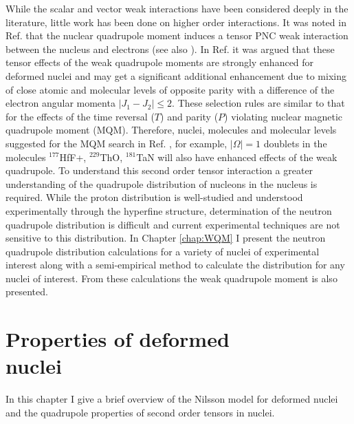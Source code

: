 \documentclass[10pt,a4paper, twoside, openright]{report}
\begin{document}
\linebreak
While the scalar and vector weak interactions have been considered deeply in the literature, little work has been done on higher order interactions. It was noted in Ref.  \cite{FS78} that the nuclear quadrupole moment induces a tensor PNC weak interaction between the nucleus and electrons (see also  \cite{KhriplovichPNC,KP91}). In Ref. \cite{Flambaum2016} it was argued that these tensor  effects of the weak quadrupole moments are strongly enhanced for deformed nuclei and may get a significant additional enhancement due to mixing of  close atomic and molecular levels of opposite parity with a  difference of the electron angular momenta $|J_1-J_2| \le 2$. These selection rules are similar to that for the effects of the time reversal ($T$) and parity ($P$) violating nuclear magnetic quadrupole moment (MQM). Therefore, nuclei, molecules and molecular levels  suggested for the MQM search in Ref. \cite{Flambaum2014},  for example,  $|\Omega |=1$ doublets in the molecules $^{177}$HfF+, $^{229}$ThO, $^{181}$TaN will also have enhanced effects of the weak quadrupole. To understand this second order tensor interaction a greater understanding of the quadrupole distribution of nucleons in the nucleus is required. While the proton distribution is well-studied and understood experimentally through the hyperfine structure, determination of the neutron quadrupole distribution is difficult and current experimental techniques are not sensitive to this distribution.  In Chapter \ref{chap:WQM} I present the neutron quadrupole distribution calculations for a variety of nuclei of experimental interest along with a semi-empirical method to calculate the distribution for any nuclei of interest. From these calculations the weak quadrupole moment is also presented.
\chapter[Properties of deformed nuclei]{Properties of deformed \\ nuclei} \label{chap:Deformed}
 In this chapter I give a brief overview of the Nilsson model for deformed nuclei and the quadrupole properties of second order tensors in nuclei.
\end{document}
